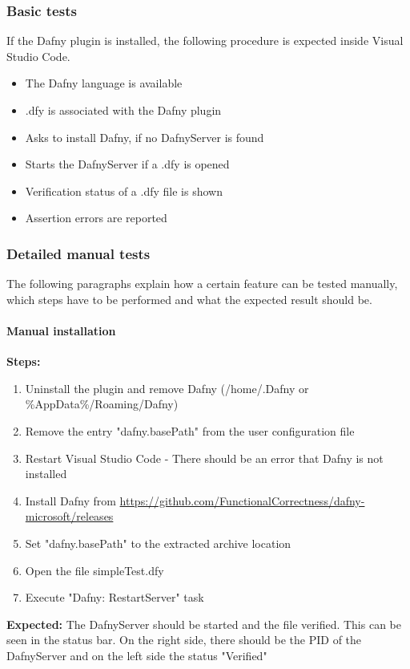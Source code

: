 \subsubsection{Basic tests}
If the Dafny plugin is installed, the following procedure is expected inside Visual Studio Code. 
\begin{itemize}
\item The Dafny language is available
\item .dfy is associated with the Dafny plugin
\item Asks to install Dafny, if no DafnyServer is found 
\item Starts the DafnyServer if a .dfy is opened
\item Verification status of a .dfy file is shown
\item Assertion errors are reported
\end{itemize}

\subsubsection{Detailed manual tests}
The following paragraphs explain how a certain feature can be tested manually, which steps have to be performed and what the expected result should be.

\paragraph{Manual installation}
\textbf{\newline Steps:}
\begin{enumerate}
\item Uninstall the plugin and remove Dafny (/home/.Dafny or \%AppData\%/Roaming/Dafny)
\item Remove the entry "dafny.basePath" from the user configuration file 
\item Restart Visual Studio Code - There should be an error that Dafny is not installed
\item Install Dafny from \href{https://github.com/FunctionalCorrectness/dafny-microsoft/releases}{https://github.com/FunctionalCorrectness/dafny-microsoft/releases}
\item Set "dafny.basePath" to the extracted archive location
\item Open the file simpleTest.dfy
\item Execute "Dafny: RestartServer" task
\end{enumerate}
\textbf{\newline Expected:}
The DafnyServer should be started and the file verified. This can be seen in the status bar. On the right side, there should be the PID of the DafnyServer and on the left side the status "Verified"

